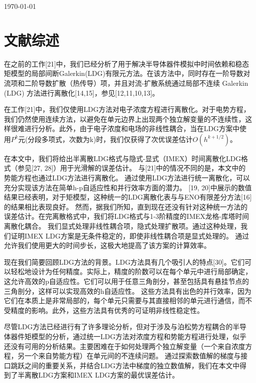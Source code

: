 \documentclass[lang=cn,newtx,10pt,scheme=chinese]{elegantbook}
\title{}
\begin{document}
\maketitle

\frontmatter

\tableofcontents

\mainmatter

\today
\chapter{文献综述}
在之前的工作[21]中，我们已经分析了用于解决半导体器件模拟中时间依赖和稳态矩模型的局部间断Galerkin(LDG)有限元方法。在该方法中，同时存在一阶导数对流项和二阶导数扩散（热传导）项，并且对流-扩散系统通过局部不连续 Galerkin (LDG) 方法进行离散化[14,15]，参见[12,11,10,13]。

在工作[21]中，我们仅使用LDG方法对电子浓度方程进行离散化。对于电势方程，我们仍然使用连续方法，以避免在单元边界上出现两个独立解变量的不连续性，这样很难进行分析。此外，由于电子浓度和电场的非线性耦合，当在LDG方案中使用$P^k$元(分段多项式，次数为k)时，我们仅获得了次优误差估计$O(h^{k+1/2})$。

在本文中，我们将给出半离散LDG格式与隐式-显式（IMEX）时间离散化LDG格式（参见[27, 28]）用于光滑解的误差估计。
与[21]中的情况不同的是，本文中的势能方程也通过LDG方法进行离散化。
通过使用LDG方法进行统一离散化，可以充分实现该方法在简单h-p自适应性和并行效率方面的潜力。
[19, 20]中展示的数值结果已经表明，对于矩模型，这种统一的LDG离散化表与与ENO有限差分方法[16]的结果相比表现良好。
然而，据我们所知，直到现在还没有针对这种统一方法的误差估计。在完离散格式中，我们将LDG格式与1-3阶精度的IMEX龙格-库塔时间离散化耦合。
我们显式处理非线性耦合项，隐式处理扩散项。通过这种处理，我们证明IMEX LDG方案是无条件稳定的，即使非线性耦合项是显式处理的。
通过允许我们使用更大的时间步长，这极大地提高了该方案的计算效率。

现在我们简要回顾LDG方法的背景。LDG方法具有几个吸引人的特点[30]。它们可以轻松地设计为任何精度。实际上，精度的阶数可以在每个单元中进行局部确定，这允许高效的p自适应性。它们可以用于任意三角剖分，甚至包括具有悬挂节点的三角剖分，这样可以实现高效的h自适应性。
这些方法具有出色的并行效率，因为它们在本质上是非常局部的，每个单元只需要与其直接相邻的单元进行通信，而不受精度的影响。此外，这些方法具有优秀的可证明非线性稳定性。

尽管LDG方法已经进行有了许多理论分析，但对于涉及与泊松势方程耦合的半导体器件矩模型的分析，通过统一LDG方法对浓度方程和势能方程进行处理，似乎还没有可用的分析结果。主要困难在于如何处理两个独立解变量（一个来自浓度方程，另一个来自势能方程）在单元间的不连续问题。
通过探索数值解的梯度与接口跳跃之间的重要关系，并结合LDG方法中梯度的独立数值解，我们在本文中得到了半离散LDG方案和IMEX LDG方案的最优误差估计。
\end{document}
